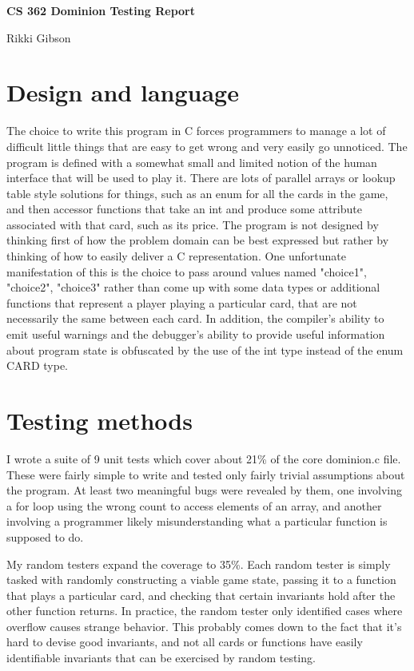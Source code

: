 \documentclass[11pt]{article}
\begin{document}
\Large\textbf{CS 362 Dominion Testing Report}

\large{Rikki Gibson}
\normalsize

\bigskip
\section{Design and language}
The choice to write this program in C forces programmers to manage a lot of difficult little things that are easy to get wrong and very easily go unnoticed. The program is defined with a somewhat small and limited notion of the human interface that will be used to play it. There are lots of parallel arrays or lookup table style solutions for things, such as an enum for all the cards in the game, and then accessor functions that take an int and produce some attribute associated with that card, such as its price. The program is not designed by thinking first of how the problem domain can be best expressed but rather by thinking of how to easily deliver a C representation. One unfortunate manifestation of this is the choice to pass around values named "choice1", "choice2", "choice3" rather than come up with some data types or additional functions that represent a player playing a particular card, that are not necessarily the same between each card. In addition, the compiler's ability to emit useful warnings and the debugger's ability to provide useful information about program state is obfuscated by the use of the int type instead of the enum CARD type.

\section{Testing methods}
I wrote a suite of 9 unit tests which cover about 21\% of the core dominion.c file. These were fairly simple to write and tested only fairly trivial assumptions about the program. At least two meaningful bugs were revealed by them, one involving a for loop using the wrong count to access elements of an array, and another involving a programmer likely misunderstanding what a particular function is supposed to do.

My random testers expand the coverage to 35\%. Each random tester is simply tasked with randomly constructing a viable game state, passing it to a function that plays a particular card, and checking that certain invariants hold after the other function returns. In practice, the random tester only identified cases where overflow causes strange behavior. This probably comes down to the fact that it's hard to devise good invariants, and not all cards or functions have easily identifiable invariants that can be exercised by random testing.
\end{document}
